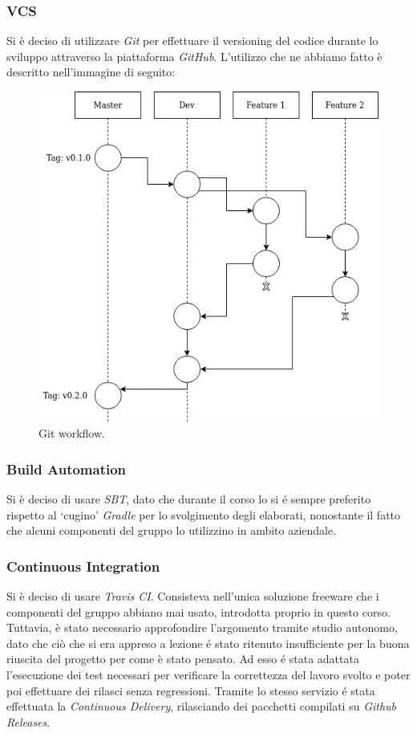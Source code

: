 \documentclass[a4paper,10pt]{article}
\begin{document}
    \subsubsection{VCS}
    Si è deciso di utilizzare \textit{Git} per effettuare il versioning del codice durante lo sviluppo attraverso la piattaforma \textit{GitHub}. L’utilizzo che ne abbiamo fatto è descritto nell'immagine di seguito:
    \begin{center}
        \begin{figure}
            \caption{Git workflow.}
            \includegraphics[width=\textwidth, scale=0.8]{git-workflow-1-1.png}
        \end{figure}
    \end{center}

    \subsubsection{Build Automation}
    Si è deciso di usare \textit{SBT}, dato che durante il corso lo si é sempre preferito rispetto al ‘cugino’ \textit{Gradle} per lo svolgimento degli elaborati, nonostante il fatto che alcuni componenti del gruppo lo utilizzino in ambito aziendale.

    \subsubsection{Continuous Integration}
    Si è deciso di usare \textit{Travis CI}. Consisteva nell'unica soluzione freeware che i componenti del gruppo abbiano mai usato, introdotta proprio in questo corso. Tuttavia, è stato necessario approfondire l'argomento tramite studio autonomo, dato che ciò che si era appreso a lezione é stato ritenuto insufficiente per la buona riuscita del progetto per come è stato pensato. Ad esso é stata adattata l'esecuzione dei test necessari per verificare la correttezza del lavoro svolto e poter poi effettuare dei rilasci senza regressioni. Tramite lo stesso servizio é stata effettuata la \textit{Continuous Delivery}, rilasciando dei pacchetti compilati su \textit{Github Releases}.
\end{document}
